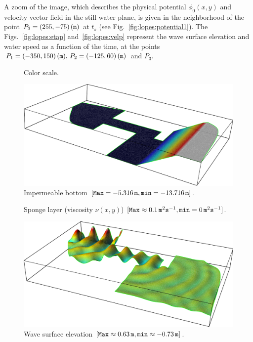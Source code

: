  A zoom of the image, which describes the physical potential
 $\phi_0(x,y)$ and velocity vector field in the still water
 plane, is given in the neighborhood of the point
 $P_3=(255,-75)\,({\tt m})$ at $t_s$ (see
 Fig.~\ref{fig:lopes:potential1}).  The
 Figs.~\ref{fig:lopes:etap} and~\ref{fig:lopes:velp}
 represent the wave surface elevation and water speed as a
 function of the time, at the points $P_1=(-350, 150)\,({\tt
   m}),\, P_2=(-125,60)\,({\tt m})$ and $P_3$.
\begin{figure}
\begin{center}
\end{center}
\caption{Color scale.}
\label{fig:lopes:scale}
\end{figure}

\begin{figure}
\begin{center}
\includegraphics[width=\largefig]{chapters/lopes/pdf/depth.pdf}
\end{center}
\caption{Impermeable bottom $[{\tt Max}=-5.316\,{\tt m},{\tt
      min}=-13.716\,{\tt m}]$.}
\label{fig:lopes:harbor_depth}
\end{figure}
\begin{figure}
\begin{center}
\end{center}
\caption{Sponge layer (viscosity $\nu(x,y)$) $[{\tt Max}
    \approx 0.1\,{\tt m}^2{\tt s}^{-1}, {\tt min}=0 \,{\tt
      m}^2{\tt s}^{-1}]$.}
\label{fig:lopes:sponge}
\end{figure}
\begin{figure}
\begin{center}
\includegraphics[width=\largefig]{chapters/lopes/pdf/eta.pdf}
\end{center}
\caption{Wave surface elevation $[{\tt Max}\approx 0.63\,{\tt m},
    {\tt min}\approx-0.73\,{\tt m}] $.}
\label{fig:lopes:elevation}
\end{figure}
